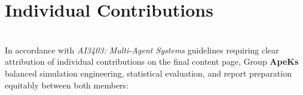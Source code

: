 \documentclass[11pt,a4paper,oneside]{report}
\newcommand{\RepTeam}{ApeKs}
\begin{document}
\chapter[Contributions]{Individual Contributions}
\label{cp:Contributions}

\parindent0pt\vspace{-22pt}

\\[1pt]
{\small In accordance with \textit{AI3403: Multi-Agent Systems} guidelines requiring clear attribution of individual contributions on the final content page, Group \textbf{\RepTeam} balanced simulation engineering, statistical evaluation, and report preparation equitably between both members:}
\end{document}
